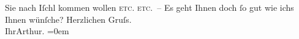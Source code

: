 \begin{ledgroupsized}[t]{13cm}
               Sie nach Iſchl kommen wollen \textsc{etc. etc.} –\pend
           \pstart
           Es geht Ihnen doch ſo gut wie ichs Ihnen wünſche?\pend
           \pstart
           Herzlichen Gruſs.{\\[\baselineskip]}Ihr\spacefill\mbox{Arthur.}\pend
           \leftskip=0em{}\endnumbering{}\end{ledgroupsized}  \newcommand{\dateiname}{L00029}\newcommand{\titel}{Arthur Schnitzler an Richard Beer-Hofmann, 11. 8. 1891}\newcommand{\editorInnen}{Martin Anton Müller und Gerd-Hermann Susen}
      